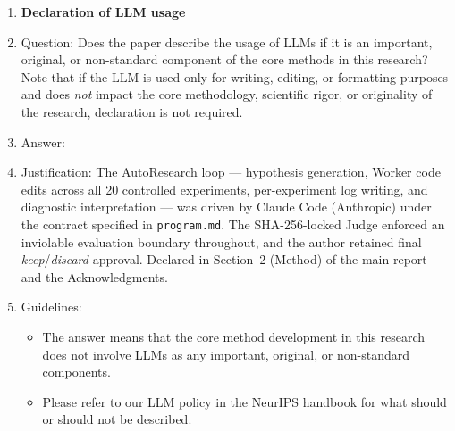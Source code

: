 \documentclass{article}
\begin{document}
\begin{enumerate}
\item {\bf Declaration of LLM usage}
    \item[] Question: Does the paper describe the usage of LLMs if it is an important, original, or non-standard component of the core methods in this research? Note that if the LLM is used only for writing, editing, or formatting purposes and does \emph{not} impact the core methodology, scientific rigor, or originality of the research, declaration is not required.
    \item[] Answer: \answerYes{}
    \item[] Justification: The AutoResearch loop --- hypothesis generation, Worker code edits across all 20 controlled experiments, per-experiment log writing, and diagnostic interpretation --- was driven by Claude Code (Anthropic) under the contract specified in \texttt{program.md}. The SHA-256-locked Judge enforced an inviolable evaluation boundary throughout, and the author retained final \emph{keep}/\emph{discard} approval. Declared in Section~2 (Method) of the main report and the Acknowledgments.
    \item[] Guidelines:
    \begin{itemize}
        \item The answer \answerNA{} means that the core method development in this research does not involve LLMs as any important, original, or non-standard components.
        \item Please refer to our LLM policy in the NeurIPS handbook for what should or should not be described.
    \end{itemize}

\end{enumerate}
\end{document}
